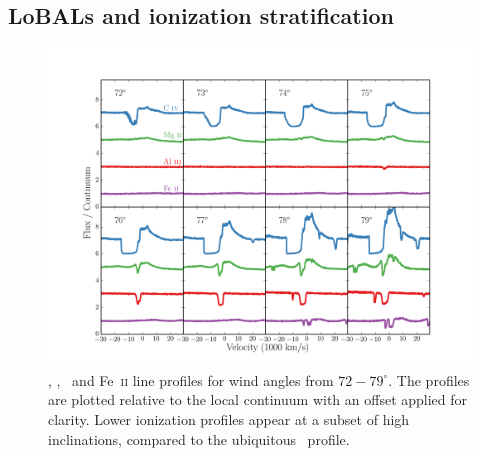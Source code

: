 \documentclass[preprint, a4paper, 11pt]{aastex}
\begin{document}



\subsection{LoBALs and ionization stratification}

\begin{figure} %
\centering
\includegraphics[width=1.0\textwidth]{figures/c4_angles.png}
\caption
{
\civ , \mg , \al\ and Fe~\textsc{ii} line profiles for wind angles
from $72-79^\circ$. The profiles are plotted relative to the local
continuum with an offset applied for clarity. Lower ionization
profiles appear at a subset of high inclinations, compared
to the ubiquitous \civ\ profile.
}
\label{fig:lobal}
\end{figure} %
\end{document}
